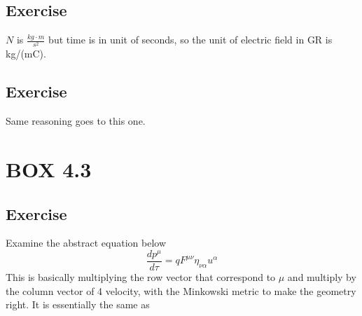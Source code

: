 \documentclass[12pt]{memoir}
\newcommand{\dydx}[2]{\frac{d #1}{d #2}}
\begin{document}
\subsection{Exercise}
$N$ is $\frac{kg\cdot m}{s^2}$ but time is in unit of seconds, so the unit of electric field in GR is kg/(m\cdot C).
\subsection{Exercise}
Same reasoning goes to this one.

\section{BOX 4.3}
\subsection{Exercise}
Examine the abstract equation below
\[
\dydx{p^{\mu}}{\tau} = qF^{\mu\nu}\eta_{\nu\alpha}u^{\alpha}
\]
This is basically multiplying the row vector that correspond to $\mu$ and multiply by the column vector of 4 velocity, with the Minkowski metric to make the geometry right. It is essentially the same as


            
            
\end{document}
